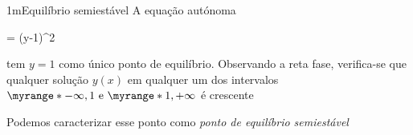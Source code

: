 \documentclass["AM3C-Slides_annotations.tex"]{subfiles}
\begin{document}
\begin{exampleBox}1m{Equilíbrio semiestável} %
  A equação autónoma
  \begin{BM}
     = (y-1)^2
  \end{BM}
  tem \(y=1\) como único ponto de equilíbrio. Observando a reta fase, verifica-se que qualquer solução \(y(x)\) em qualquer um dos intervalos \(\myrange*{-\infty,1}\text{ e }\myrange*{1,+\infty}\) é crescente
  \begin{center}
  \end{center}
  Podemos caracterizar esse ponto como \emph{ponto de equilíbrio semiestável}
\end{exampleBox}
\end{document}
